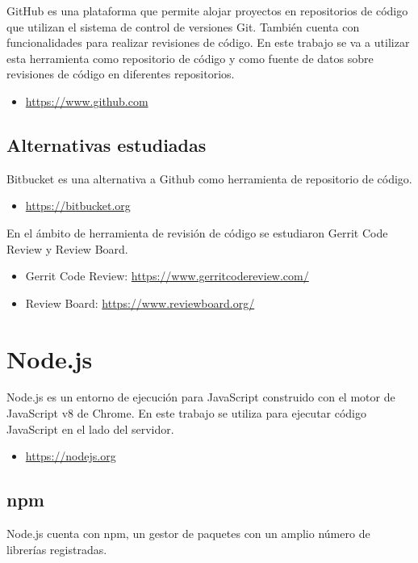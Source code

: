 GitHub es una plataforma que permite alojar proyectos en repositorios de código que utilizan el sistema de control de versiones Git. También cuenta con funcionalidades para realizar revisiones de código. En este trabajo se va a utilizar esta herramienta como repositorio de código y como fuente de datos sobre revisiones de código en diferentes repositorios.

\begin{itemize}
	\item \url{https://www.github.com}
\end{itemize}

\subsection{Alternativas estudiadas}

Bitbucket es una alternativa a Github como herramienta de repositorio de código.

\begin{itemize}
	\item \url{https://bitbucket.org}
\end{itemize}

En el ámbito de herramienta de revisión de código se estudiaron Gerrit Code Review y Review Board.

\begin{itemize}
	\item Gerrit Code Review: \url{https://www.gerritcodereview.com/}
	\item Review Board: \url{https://www.reviewboard.org/}
\end{itemize}

\section{Node.js}

Node.js es un entorno de ejecución para JavaScript construido con el motor de JavaScript v8 de Chrome. En este trabajo se utiliza para ejecutar código JavaScript en el lado del servidor.

\begin{itemize}
	\item \url{https://nodejs.org}
\end{itemize}

\subsection{npm}

Node.js cuenta con npm, un gestor de paquetes con un amplio número de librerías registradas.

